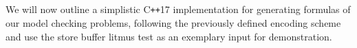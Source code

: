 




\newpage
\subsection{\SMTLIB{}}

\newcommand{\Cpp}{C\texttt{++}17 }

We will now outline a simplistic \Cpp implementation for generating \SMTLIB{} formulas of our model checking problems, following the previously defined encoding scheme
and use the store buffer litmus test as an exemplary input for demonstration.

